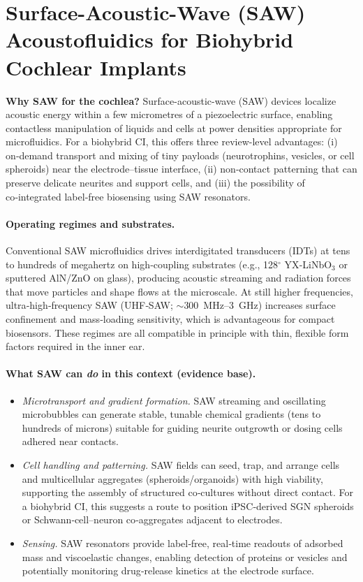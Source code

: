 \section{Surface-Acoustic-Wave (SAW) Acoustofluidics for Biohybrid Cochlear Implants}
\label{sec:saw}

\noindent\textbf{Why SAW for the cochlea?} Surface-acoustic-wave (SAW) devices localize acoustic energy within a few micrometres of a piezoelectric surface, enabling contactless manipulation of liquids and cells at power densities appropriate for microfluidics.\cite{Ding2013,rufo2022} For a biohybrid CI, this offers three review-level advantages: (i) on‑demand transport and mixing of tiny payloads (neurotrophins, vesicles, or cell spheroids) near the electrode–tissue interface, (ii) non‑contact patterning that can preserve delicate neurites and support cells, and (iii) the possibility of co‑integrated label‑free biosensing using SAW resonators.\cite{Agostini2021_UHFSAW,Mandal2022}

\paragraph{Operating regimes and substrates.} Conventional SAW microfluidics drives interdigitated transducers (IDTs) at tens to hundreds of megahertz on high‑coupling substrates (e.g., 128$^{\circ}$ YX‑LiNbO$_3$ or sputtered AlN/ZnO on glass), producing acoustic streaming and radiation forces that move particles and shape flows at the microscale.\cite{Ding2013,Campbell1998} At still higher frequencies, ultra‑high‑frequency SAW (UHF‑SAW; $\sim$300~MHz–3~GHz) increases surface confinement and mass‑loading sensitivity, which is advantageous for compact biosensors.\cite{Agostini2021_UHFSAW} These regimes are all compatible in principle with thin, flexible form factors required in the inner ear.

\paragraph{What SAW can \emph{do} in this context (evidence base).}
\begin{itemize}
	\item \emph{Microtransport and gradient formation.} SAW streaming and oscillating microbubbles can generate stable, tunable chemical gradients (tens to hundreds of microns) suitable for guiding neurite outgrowth or dosing cells adhered near contacts.\cite{Ahmed2016_LabChip,Ding2013}
	\item \emph{Cell handling and patterning.} SAW fields can seed, trap, and arrange cells and multicellular aggregates (spheroids/organoids) with high viability, supporting the assembly of structured co‑cultures without direct contact.\cite{Li2007,rufo2022} For a biohybrid CI, this suggests a route to position iPSC‑derived SGN spheroids or Schwann‑cell–neuron co‑aggregates adjacent to electrodes.
	\item \emph{Sensing.} SAW resonators provide label‑free, real‑time readouts of adsorbed mass and viscoelastic changes, enabling detection of proteins or vesicles and potentially monitoring drug‑release kinetics at the electrode surface.\cite{Agostini2021_UHFSAW,Mandal2022}
\end{itemize}

